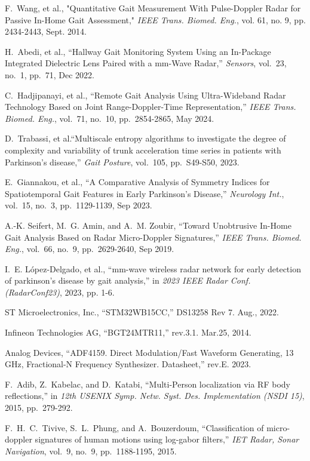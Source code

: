  F.~Wang, et al., "Quantitative Gait Measurement With Pulse-Doppler Radar for Passive In-Home Gait Assessment," \emph{IEEE Trans. Biomed. Eng.}, vol. 61, no. 9, pp. 2434-2443, Sept. 2014.

 H.~Abedi, et al., ``Hallway Gait Monitoring System Using an In-Package Integrated Dielectric Lens Paired with a mm-Wave Radar,'' \emph{Sensors}, vol.~23, no.~1, pp.~71, Dec 2022.

 C.~Hadjipanayi, et al., ``Remote Gait Analysis Using Ultra-Wideband Radar Technology Based on Joint Range-Doppler-Time Representation,'' \emph{IEEE Trans. Biomed. Eng.}, vol.~71, no.~10, pp.~2854-2865, May 2024.

 D.~Trabassi, et al.``Multiscale entropy algorithms to investigate the degree of complexity and variability of trunk acceleration time series in patients with Parkinson's disease,'' \emph{Gait Posture}, vol.~105, pp.~S49-S50, 2023.

 E.~Giannakou, et al., ``A Comparative Analysis of Symmetry Indices for Spatiotemporal Gait Features in Early Parkinson's Disease,'' \emph{Neurology Int.}, vol.~15, no.~3, pp.~1129-1139, Sep 2023.

 A.-K. Seifert, M.~G. Amin, and A.~M. Zoubir, ``Toward Unobtrusive In-Home Gait Analysis Based on Radar Micro-Doppler Signatures,'' \emph{IEEE Trans. Biomed. Eng.}, vol.~66, no.~9, pp.~2629-2640, Sep 2019.

 I.~E. López-Delgado, et al., ``mm-wave wireless radar network for early detection of parkinson's disease by gait analysis,'' in \emph{2023 IEEE Radar Conf. (RadarConf23)}, 2023, pp. 1-6.

 ST Microelectronics, Inc., ``STM32WB15CC,'' DS13258 Rev 7. Aug., 2022.

 Infineon Technologies AG, ``BGT24MTR11,'' rev.3.1. Mar.25, 2014.

 Analog Devices, ``ADF4159. Direct Modulation/Fast Waveform Generating, 13 GHz,
Fractional-N Frequency Synthesizer. Datasheet,'' rev.E. 2023.

 F.~Adib, Z.~Kabelac, and D.~Katabi, ``Multi-Person localization via RF body reflections,'' in \emph{12th USENIX Symp. Netw. Syst. Des. Implementation (NSDI 15)}, 2015, pp.~279-292.

 F.~H.~C.~Tivive, S.~L.~Phung, and A.~Bouzerdoum, ``Classification of micro-doppler signatures of human motions using log-gabor filters,'' \emph{IET Radar, Sonar Navigation}, vol.~9, no.~9, pp.~1188-1195, 2015.

